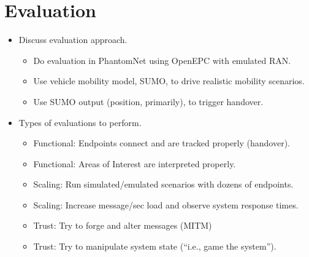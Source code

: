 \section*{Evaluation}

\begin{itemize}
\item Discuss evaluation approach.
  \begin{itemize}
  \item Do evaluation in PhantomNet using OpenEPC with emulated RAN.
  \item Use vehicle mobility model, SUMO, to drive realistic mobility scenarios.
  \item Use SUMO output (position, primarily), to trigger handover.
  \end{itemize}
\item Types of evaluations to perform.
  \begin{itemize}
  \item Functional: Endpoints connect and are tracked properly (handover).
  \item Functional: Areas of Interest are interpreted properly.
  \item Scaling: Run simulated/emulated scenarios with dozens of endpoints.
  \item Scaling: Increase message/sec load and observe system response times.
  \item Trust: Try to forge and alter messages (MITM)
  \item Trust: Try to manipulate system state (``i.e., game the system'').
  \end{itemize}
\end{itemize}
